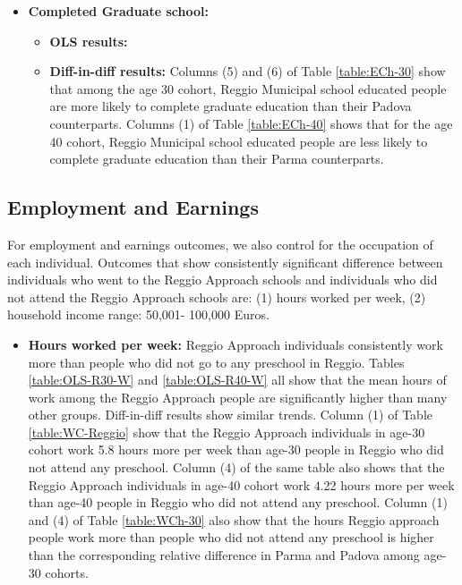 \documentclass[11pt]{article}
\begin{document}
\begin{itemize}
\item \textbf{Completed Graduate school:} 
	\begin{itemize}
	\item \textbf{OLS results:} %
	\item \textbf{Diff-in-diff results:}  Columns (5) and (6) of Table \ref{table:ECh-30} show that among the age 30 cohort, Reggio Municipal school educated people are more likely to complete graduate education than their Padova counterparts.  Columns (1) of Table \ref{table:ECh-40} shows that for the age 40 cohort,  Reggio Municipal school educated people are less  likely to complete graduate education than their Parma counterparts.
\end{itemize}

\end{itemize}

\subsection{Employment and Earnings}
For employment and earnings outcomes, we also control for the occupation of each individual. Outcomes that show consistently significant difference between individuals who went to the Reggio Approach schools and individuals who did not attend the Reggio Approach schools are: (1) hours worked per week, (2) household income range: 50,001- 100,000 Euros.

\begin{itemize}
\item \textbf{Hours worked per week:} Reggio Approach individuals consistently work more than people who did not go to any preschool in Reggio. Tables \ref{table:OLS-R30-W} and \ref{table:OLS-R40-W} all show that the mean hours of work among the Reggio Approach people are significantly higher than many other groups. Diff-in-diff results show similar trends. Column (1) of Table \ref{table:WC-Reggio} show that the Reggio Approach individuals in age-30 cohort work 5.8 hours more per week than age-30 people in Reggio who did not attend any preschool. Column (4) of the same table also shows that the Reggio Approach individuals in age-40 cohort work 4.22 hours more per week than age-40 people in Reggio who did not attend any preschool. Column (1) and (4) of Table \ref{table:WCh-30} also show that the hours Reggio approach people work more than people who did not attend any preschool is higher than the corresponding relative difference in Parma and Padova among age-30 cohorts.  
\end{itemize}  
\end{document}
